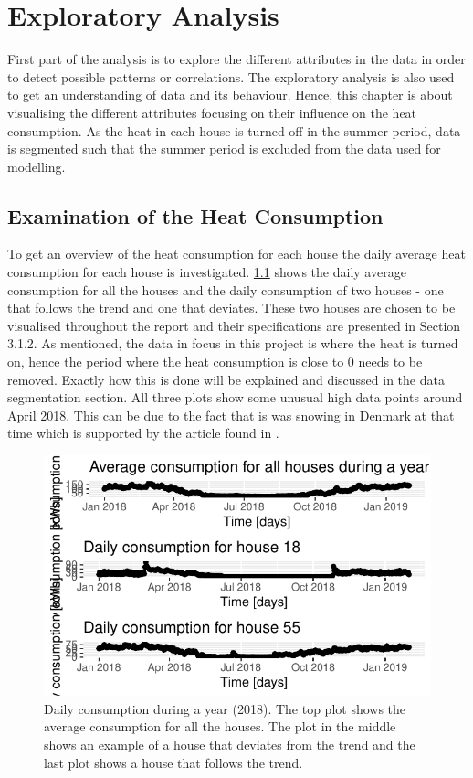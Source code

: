 \chapter{Exploratory Analysis}
\label{chap: exploratory}
First part of the analysis is to explore the different attributes in the data in order to detect possible patterns or correlations. The exploratory analysis is also used to get an understanding of data and its behaviour. Hence, this chapter is about visualising the different attributes focusing on their influence on the heat consumption. As the heat in each house is turned off in the summer period, data is segmented such that the summer period is excluded from the data used for modelling. 

\section{Examination of the Heat Consumption}
To get an overview of the heat consumption for each house the daily average heat consumption for each house is investigated. \cref{fig: daily_cons} shows the daily average consumption for all the houses and the daily consumption of two houses - one that follows the trend and one that deviates. These two houses are chosen to be visualised throughout the report and their specifications are presented in Section 3.1.2. As mentioned, the data in focus in this project is where the heat is turned on, hence the period where the heat consumption is close to 0 needs to be removed. Exactly how this is done will be explained and discussed in the data segmentation section. All three plots show some unusual high data points around April 2018. This can be due to the fact that is was snowing in Denmark at that time which is supported by the article found in \cite{vejr2018}. 
\begin{figure}[H]
    \centering
    \includegraphics[width=1.\textwidth]{../../../figures/daily_cons.pdf}
    \caption{Daily consumption during a year (2018). The top plot shows the average consumption for all the houses. The plot in the middle shows an example of a house that deviates from the trend and the last plot shows a house that follows the trend.}
    \label{fig: daily_cons}
\end{figure}
